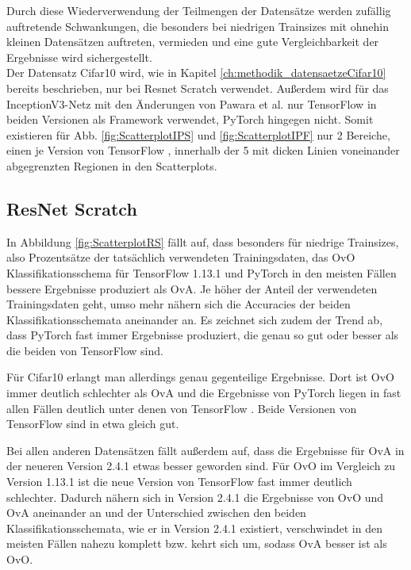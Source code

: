 Durch diese Wiederverwendung der Teilmengen der Datensätze werden zufällig auftretende Schwankungen, die besonders bei niedrigen Trainsizes mit ohnehin kleinen Datensätzen auftreten, vermieden und eine gute Vergleichbarkeit der Ergebnisse wird sichergestellt.\\

Der Datensatz Cifar10 \cite{cifar10} wird, wie in Kapitel \ref{ch:methodik_datensaetzeCifar10} bereits beschrieben, nur bei Resnet Scratch verwendet. Außerdem wird für das InceptionV3-Netz mit den Änderungen von Pawara et al. \cite{pawaraWebsiteCode} nur TensorFlow \cite{tensorflow} in beiden Versionen als Framework verwendet, PyTorch \cite{pytorch} hingegen nicht. Somit existieren für Abb. \ref{fig:ScatterplotIPS} und \ref{fig:ScatterplotIPF} nur 2 Bereiche, einen je Version von TensorFlow \cite{tensorflow}, innerhalb der 5 mit dicken Linien voneinander abgegrenzten Regionen in den Scatterplots.


\subsection{ResNet Scratch}
\label{ch:ergebnisseOvOOvA-RS}
In Abbildung \ref{fig:ScatterplotRS} fällt auf, dass besonders für niedrige Trainsizes, also Prozentsätze der tatsächlich verwendeten Trainingsdaten, das OvO Klassifikationsschema für TensorFlow 1.13.1 \cite{tensorflow} und PyTorch \cite{pytorch} in den meisten Fällen bessere Ergebnisse produziert als OvA. Je höher der Anteil der verwendeten Trainingsdaten geht, umso mehr nähern sich die Accuracies der beiden Klassifikationsschemata aneinander an. Es zeichnet sich zudem der Trend ab, dass PyTorch \cite{pytorch} fast immer Ergebnisse produziert, die genau so gut oder besser als die beiden von TensorFlow \cite{tensorflow} sind.


Für Cifar10 \cite{cifar10} erlangt man allerdings genau gegenteilige Ergebnisse. Dort ist OvO immer deutlich schlechter als OvA und die Ergebnisse von PyTorch \cite{pytorch} liegen in fast allen Fällen deutlich unter denen von TensorFlow \cite{tensorflow}. Beide Versionen von TensorFlow \cite{tensorflow} sind in etwa gleich gut.

Bei allen anderen Datensätzen fällt außerdem auf, dass die Ergebnisse für OvA in der neueren Version 2.4.1 etwas besser geworden sind. Für OvO im Vergleich zu Version 1.13.1 ist die neue Version von TensorFlow \cite{tensorflow} fast immer deutlich schlechter. Dadurch nähern sich in Version 2.4.1 die Ergebnisse von OvO und OvA aneinander an und der Unterschied zwischen den beiden Klassifikationsschemata, wie er in Version 2.4.1 existiert, verschwindet in den meisten Fällen nahezu komplett bzw. kehrt sich um, sodass OvA besser ist als OvO.

